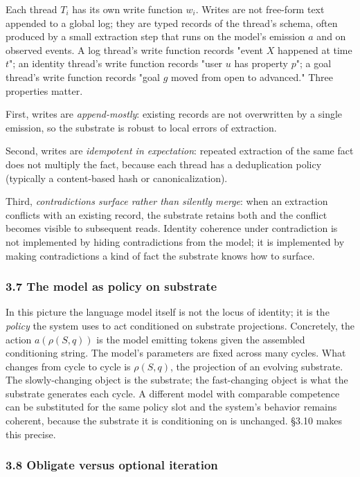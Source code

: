 \documentclass[11pt,letterpaper]{article}
\begin{document}
Each thread $T_i$ has its own write function $w_i$. Writes are not free-form text appended to a global log; they are typed records of the thread's schema, often produced by a small extraction step that runs on the model's emission $a$ and on observed events. A log thread's write function records "event $X$ happened at time $t$"; an identity thread's write function records "user $u$ has property $p$"; a goal thread's write function records "goal $g$ moved from open to advanced." Three properties matter.

First, writes are \emph{append-mostly}: existing records are not overwritten by a single emission, so the substrate is robust to local errors of extraction.

Second, writes are \emph{idempotent in expectation}: repeated extraction of the same fact does not multiply the fact, because each thread has a deduplication policy (typically a content-based hash or canonicalization).

Third, \emph{contradictions surface rather than silently merge}: when an extraction conflicts with an existing record, the substrate retains both and the conflict becomes visible to subsequent reads. Identity coherence under contradiction is not implemented by hiding contradictions from the model; it is implemented by making contradictions a kind of fact the substrate knows how to surface.

\subsubsection*{3.7 The model as policy on substrate}

In this picture the language model itself is not the locus of identity; it is the \emph{policy} the system uses to act conditioned on substrate projections. Concretely, the action $a(\rho(S, q))$ is the model emitting tokens given the assembled conditioning string. The model's parameters are fixed across many cycles. What changes from cycle to cycle is $\rho(S, q)$, the projection of an evolving substrate. The slowly-changing object is the substrate; the fast-changing object is what the substrate generates each cycle. A different model with comparable competence can be substituted for the same policy slot and the system's behavior remains coherent, because the substrate it is conditioning on is unchanged. §3.10 makes this precise.

\subsubsection*{3.8 Obligate versus optional iteration}
\end{document}
